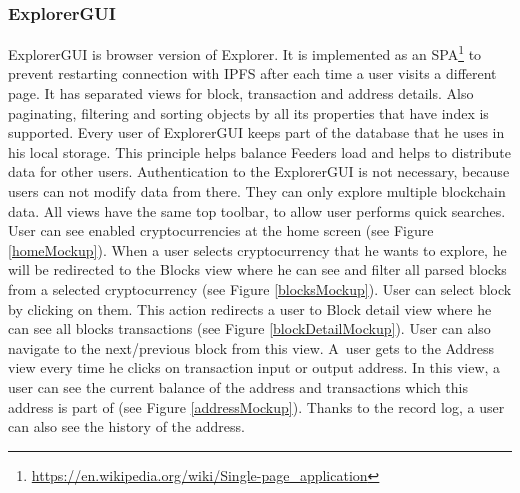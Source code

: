\subsubsection{ExplorerGUI}
ExplorerGUI is browser version of Explorer. It is implemented as an SPA\footnote{\url{https://en.wikipedia.org/wiki/Single-page_application}} to prevent restarting connection with IPFS after each time a user visits a different page. It has separated views for block, transaction and address details. Also paginating, filtering and sorting objects by all its properties that have index is supported. Every user of ExplorerGUI keeps part of the database that he uses in his local storage. This principle helps balance Feeders load and helps to distribute data for other users. Authentication to the ExplorerGUI is not necessary, because users can not modify data from there. They can only explore multiple blockchain data. All views have the same top toolbar, to allow user performs quick searches. User can see enabled cryptocurrencies at the home screen (see Figure \ref{homeMockup}). When a user selects cryptocurrency that he wants to explore, he will be redirected to the Blocks view where he can see and filter all parsed blocks from a selected cryptocurrency (see Figure \ref{blocksMockup}). User can select block by clicking on them. This action redirects a user to Block detail view where he can see all blocks transactions (see Figure \ref{blockDetailMockup}). User can also navigate to the next/previous block from this view. A~user gets to the Address view every time he clicks on transaction input or output address. In this view, a user can see the current balance of the address and transactions which this address is part of (see Figure \ref{addressMockup}). Thanks to the record log, a user can also see the history of the address. 


